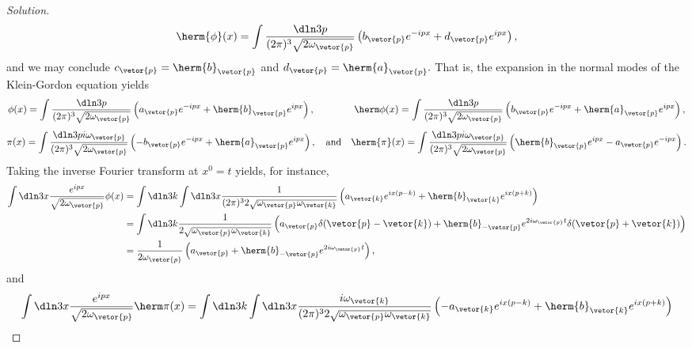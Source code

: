 \begin{proof}[Solution]
   \begin{equation*}
      \herm{\phi}(x) = \int\frac{\dln3p}{(2\pi)^3 \sqrt{2\omega_{\vetor{p}}}} \left(b_{\vetor{p}}e^{-ipx} + d_{\vetor{p}}e^{ipx}\right),
   \end{equation*}
   and we may conclude \(c_{\vetor{p}} = \herm{b}_{\vetor{p}}\) and \(d_{\vetor{p}} = \herm{a}_{\vetor{p}}.\) That is, the expansion in the normal modes of the Klein-Gordon equation yields
   \begin{equation*}
      \phi(x) = \int \frac{\dln3p}{(2\pi)^3 \sqrt{2\omega_{\vetor{p}}}} \left(a_{\vetor{p}} e^{-ipx} + \herm{b}_{\vetor{p}} e^{ipx}\right),\qquad\qquad
      \herm\phi(x) = \int \frac{\dln3p}{(2\pi)^3 \sqrt{2\omega_{\vetor{p}}}} \left(b_{\vetor{p}} e^{-ipx} + \herm{a}_{\vetor{p}} e^{ipx}\right),
   \end{equation*}
   \begin{equation*}
      \pi(x) = \int \frac{\dln3p i\omega_{\vetor{p}}}{(2\pi)^3 \sqrt{2\omega_{\vetor{p}}}} \left(-b_{\vetor{p}} e^{-ipx} + \herm{a}_{\vetor{p}} e^{ipx}\right),
      \quad\text{and}\quad
      \herm{\pi}(x) = \int\frac{\dln3p i \omega_{\vetor{p}}}{(2\pi)^3 \sqrt{2\omega_{\vetor{p}}}} \left(\herm{b}_{\vetor{p}}e^{ipx} - a_{\vetor{p}}e^{-ipx}\right).
   \end{equation*}
   Taking the inverse Fourier transform at \(x^0 = t\) yields, for instance,
   \begin{align*}
      \int \dln3x \frac{e^{ipx}}{\sqrt{2\omega_{\vetor{p}}}}\phi(x) &= \int \dln3k \int \dln3x \frac{1}{(2\pi)^3 2\sqrt{\omega_{\vetor{p}}\omega_{\vetor{k}}}} \left(a_{\vetor{k}}e^{ix(p - k)}+ \herm{b}_{\vetor{k}} e^{ix(p + k)}\right)\\
                                                                    &= \int \dln3k \frac{1}{2\sqrt{\omega_{\vetor{p}}\omega_{\vetor{k}}}} \left(a_{\vetor{p}}\delta(\vetor{p} - \vetor{k}) + \herm{b}_{-\vetor{p}} e^{2i \omega_{\vetor{p}}t}\delta(\vetor{p} + \vetor{k})\right)\\
                                                                    &= \frac{1}{2 \omega_{\vetor{p}}} \left(a_{\vetor{p}}  + \herm{b}_{-\vetor{p}} e^{2i \omega_{\vetor{p}}t}\right),
   \end{align*}
   and
   \begin{align*}
      \int \dln3x \frac{e^{ipx}}{\sqrt{2\omega_{\vetor{p}}}}\herm\pi(x) &= \int \dln3k \int \dln3x \frac{i\omega_{\vetor{k}}}{(2\pi)^3 2\sqrt{\omega_{\vetor{p}}\omega_{\vetor{k}}}} \left(-a_{\vetor{k}}e^{ix(p - k)} + \herm{b}_{\vetor{k}} e^{ix(p + k)}\right)\\

\end{align*}
\end{proof}
